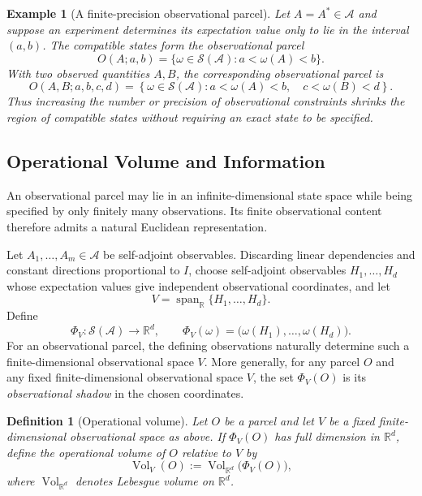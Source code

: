 \documentclass[11pt]{article}
\newtheorem{definition}[theorem]{Definition}
\newtheorem{example}[theorem]{Example}
\newcommand{\A}{\mathcal{A}}
\begin{document}
\begin{example}[A finite-precision observational parcel]
Let $A=A^*\in\A$ and suppose an experiment determines its expectation
value only to lie in the interval $(a,b)$. The compatible states form the observational parcel
\[
O(A;a,b)
=
\{\omega\in\mathcal S(\A):a<\omega(A)<b\}.
\]
With two observed quantities $A,B$, the corresponding observational
parcel is
\[
O(A,B;a,b,c,d)
=
\left\{
\omega\in\mathcal S(\A):
a<\omega(A)<b,\quad
c<\omega(B)<d
\right\}.
\]
Thus increasing the number or precision of observational constraints
shrinks the region of compatible states without requiring an exact state
to be specified.
\end{example}

\subsection{Operational Volume and Information}
\label{sec:operational-volume}
An observational parcel may lie in an infinite-dimensional state space
while being specified by only finitely many observations. Its finite
observational content therefore admits a natural Euclidean representation.

Let
$A_1,\ldots,A_m\in\A$ be self-adjoint observables. Discarding linear
dependencies and constant directions proportional to $I$, choose
self-adjoint observables $H_1,\ldots,H_d$ whose expectation values give
independent observational coordinates, and let
\[
V=\operatorname{span}_{\mathbb R}\{H_1,\ldots,H_d\}.
\]
Define
\[
\Phi_V:\mathcal S(\A)\longrightarrow\mathbb R^d,
\qquad
\Phi_V(\omega)
=
\bigl(\omega(H_1),\ldots,\omega(H_d)\bigr).
\]
For an observational parcel, the defining observations naturally
determine such a finite-dimensional observational space $V$. More
generally, for any parcel $O$ and any fixed finite-dimensional
observational space $V$, the set $\Phi_V(O)$ is its
\emph{observational shadow} in the chosen coordinates.

\begin{definition}[Operational volume]
\label{def:operational-volume}
Let $O$ be a parcel and let $V$ be a fixed finite-dimensional
observational space as above. If $\Phi_V(O)$ has full dimension in
$\mathbb R^d$, define the operational volume of $O$ relative to $V$ by
\[
\operatorname{Vol}_V(O)
:=
\operatorname{Vol}_{\mathbb R^d}\bigl(\Phi_V(O)\bigr),
\]
where $\operatorname{Vol}_{\mathbb R^d}$ denotes Lebesgue volume on
$\mathbb R^d$.
\end{definition}
\end{document}
